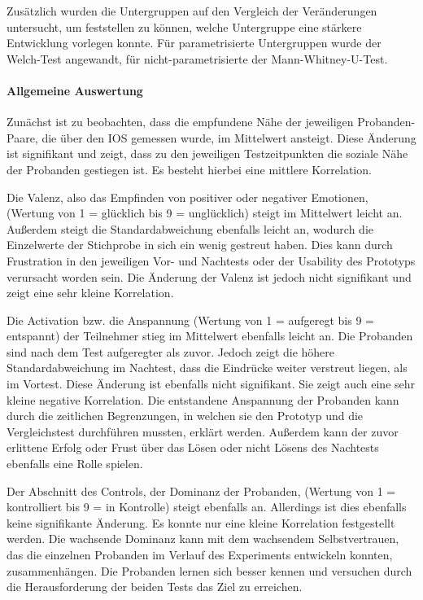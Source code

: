 Zusätzlich wurden die Untergruppen auf den Vergleich der Veränderungen untersucht, um feststellen zu können, welche Untergruppe eine stärkere Entwicklung vorlegen konnte. Für parametrisierte Untergruppen wurde der Welch-Test angewandt, für nicht-parametrisierte der Mann-Whitney-U-Test.

\paragraph{Allgemeine Auswertung}

Zunächst ist zu beobachten, dass die empfundene Nähe der jeweiligen Probanden-Paare, die über den \ac{IOS} gemessen wurde, im Mittelwert ansteigt. Diese Änderung ist signifikant und zeigt, dass zu den jeweiligen Testzeitpunkten die soziale Nähe der Probanden gestiegen ist. Es besteht hierbei eine mittlere Korrelation.

Die Valenz, also das Empfinden von positiver oder negativer Emotionen, (Wertung von 1 = glücklich bis 9 = unglücklich) steigt im Mittelwert leicht an. Außerdem steigt die Standardabweichung ebenfalls leicht an, wodurch die Einzelwerte der Stichprobe in sich ein wenig gestreut haben. Dies kann durch Frustration in den jeweiligen Vor- und Nachtests oder der Usability des Prototyps verursacht worden sein. Die Änderung der Valenz ist jedoch nicht signifikant und zeigt eine sehr kleine Korrelation. 

Die Activation bzw. die Anspannung (Wertung von 1 = aufgeregt bis 9 = entspannt) der Teilnehmer stieg im Mittelwert ebenfalls leicht an. Die Probanden sind nach dem Test aufgeregter als zuvor. Jedoch zeigt die höhere Standardabweichung im Nachtest, dass die Eindrücke weiter verstreut liegen, als im Vortest.  Diese Änderung ist ebenfalls nicht signifikant. Sie zeigt auch eine sehr kleine negative Korrelation. Die entstandene Anspannung der Probanden kann durch die zeitlichen Begrenzungen, in welchen sie den Prototyp und die Vergleichstest durchführen mussten, erklärt werden. Außerdem kann der zuvor erlittene Erfolg oder Frust über das Lösen oder nicht Lösens des Nachtests ebenfalls eine Rolle spielen. 

Der Abschnitt des Controls, der Dominanz der Probanden, (Wertung von 1 = kontrolliert bis 9 = in Kontrolle) steigt ebenfalls an. Allerdings ist dies ebenfalls keine signifikante Änderung. Es konnte nur eine kleine Korrelation festgestellt werden. Die wachsende Dominanz kann mit dem wachsendem Selbstvertrauen, das die einzelnen Probanden im Verlauf des Experiments entwickeln konnten, zusammenhängen. Die Probanden lernen sich besser kennen und versuchen durch die Herausforderung der beiden Tests das Ziel zu erreichen.



